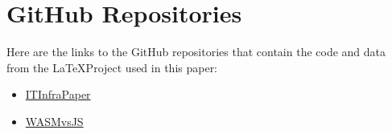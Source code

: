 \section{GitHub Repositories}
Here are the links to the GitHub repositories that contain the code and data from the \LaTeX Project used in this paper:
\begin{itemize}
    \item \href{https://github.com/nilsrueber/ITInfraPaper}{ITInfraPaper}
    \item \href{https://github.com/Foxx-l/WASMvsJS}{WASMvsJS}
\end{itemize}